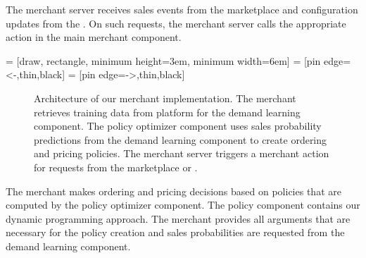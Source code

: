 The merchant server receives sales events from the marketplace and configuration updates from the \ui.
On such requests, the merchant server calls the appropriate action in the main merchant component.

\bgroup
{} = [draw, rectangle, minimum height=3em, minimum width=6em]
 = [pin edge={<-,thin,black}]
 = [pin edge={->,thin,black}]

\renewcommand{\arraystretch}{0.4}

\begin{figure}[t]
\centering
{}
\caption[Architecture of the Data-Driven Merchant]{Architecture of our merchant implementation. The merchant retrieves training data from platform for the demand learning component. The policy optimizer component uses sales probability predictions from the demand learning component to create ordering and pricing policies. The merchant server triggers a merchant action for requests from the marketplace or \ui.}
\label{fig:merchant_architecture}
\end{figure}
\egroup

The merchant makes ordering and pricing decisions based on policies that are computed by the policy optimizer component.
The policy component contains our dynamic programming approach.
The merchant provides all arguments that are necessary for the policy creation and sales probabilities are requested from the demand learning component.

